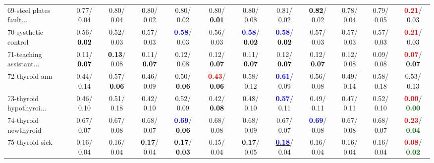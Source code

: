 \begin{table}[h]
\begin{center}
{\begin{tabular}{lc|c|c|c|c|c|c|c|c|c|c}
69-steel plates fault... &   0.77/  0.04 &   0.80/  0.04 &   0.80/  0.02 &   0.80/  0.02 &   0.80/\textcolor{black}{\textbf{  0.01}} &   0.80/  0.08 &   0.81/  0.02 & \textcolor{black}{\textbf{  0.82}}/  0.02 &   0.78/  0.04 &   0.79/  0.05 & \textcolor{red}{\textbf{  0.21}}/  0.03 \\
70-systhetic control &   0.56/\textcolor{black}{\textbf{  0.02}} &   0.52/  0.03 &   0.57/  0.03 & \textcolor{blue}{\textbf{  0.58}}/  0.03 &   0.56/  0.03 & \textcolor{blue}{\textbf{  0.58}}/\textcolor{black}{\textbf{  0.02}} & \textcolor{blue}{\textbf{  0.58}}/\textcolor{black}{\textbf{  0.02}} &   0.57/  0.03 &   0.57/  0.03 &   0.57/  0.03 & \textcolor{red}{\textbf{  0.21}}/  0.03 \\
71-teaching assistant... &   0.11/\textcolor{black}{\textbf{  0.07}} & \textcolor{black}{\textbf{  0.13}}/  0.08 &   0.11/\textcolor{black}{\textbf{  0.07}} &   0.12/  0.08 &   0.12/\textcolor{black}{\textbf{  0.07}} &   0.11/\textcolor{black}{\textbf{  0.07}} &   0.12/\textcolor{black}{\textbf{  0.07}} &   0.12/\textcolor{black}{\textbf{  0.07}} &   0.12/  0.08 &   0.09/  0.08 & \textcolor{red}{\textbf{  0.07}}/\textcolor{black}{\textbf{  0.07}} \\ \hline
72-thyroid ann &   0.44/  0.14 &   0.57/\textcolor{black}{\textbf{  0.06}} &   0.46/  0.09 &   0.50/\textcolor{black}{\textbf{  0.06}} & \textcolor{red}{\textbf{  0.43}}/\textcolor{black}{\textbf{  0.06}} &   0.58/  0.12 & \textcolor{blue}{\textbf{  0.61}}/  0.09 &   0.56/  0.08 &   0.49/  0.14 &   0.58/  0.18 &   0.53/  0.13 \\
73-thyroid hypothyroi... &   0.46/  0.10 &   0.51/  0.18 &   0.42/  0.10 &   0.52/  0.09 &   0.42/\textcolor{black}{\textbf{  0.08}} &   0.48/  0.10 & \textcolor{blue}{\textbf{  0.57}}/  0.11 &   0.49/  0.11 &   0.47/  0.11 &   0.52/  0.10 & \textcolor{red}{\textbf{  0.00}}/\textcolor{darkgreen}{\textbf{  0.00}} \\
74-thyroid newthyroid &   0.67/  0.07 &   0.67/  0.08 &   0.68/  0.07 & \textcolor{blue}{\textbf{  0.69}}/\textcolor{black}{\textbf{  0.06}} &   0.68/  0.08 &   0.68/  0.09 &   0.67/  0.07 & \textcolor{blue}{\textbf{  0.69}}/  0.08 &   0.67/  0.08 &   0.68/  0.07 & \textcolor{red}{\textbf{  0.23}}/\textcolor{darkgreen}{\textbf{  0.04}} \\
75-thyroid sick &   0.16/  0.04 &   0.16/  0.04 & \textcolor{black}{\textbf{  0.17}}/  0.04 & \textcolor{black}{\textbf{  0.17}}/\textcolor{black}{\textbf{  0.03}} &   0.15/  0.04 & \textcolor{black}{\textbf{  0.17}}/  0.05 & \underline{\textcolor{blue}{\textbf{  0.18}}}/  0.04 &   0.16/  0.04 &   0.16/  0.04 &   0.16/  0.04 & \textcolor{red}{\textbf{  0.08}}/\textcolor{darkgreen}{\textbf{  0.02}} \\

\end{tabular}}
\end{center}
\end{table}
